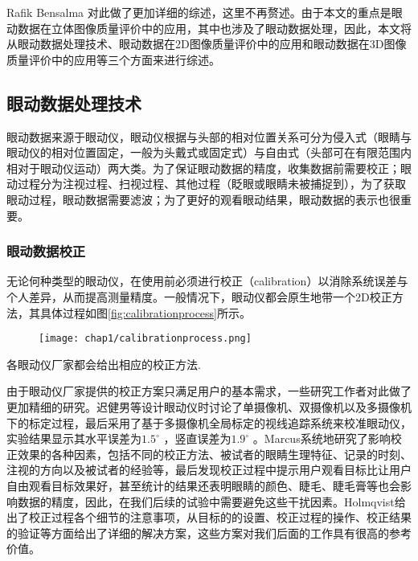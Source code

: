 Rafik Bensalma 对此做了更加详细的综述\parencite{bensalma2013perceptual}，这里不再赘述。由于本文的重点是眼动数据在立体图像质量评价中的应用，其中也涉及了眼动数据处理，因此，本文将从眼动数据处理技术、眼动数据在2D图像质量评价中的应用和眼动数据在3D图像质量评价中的应用等三个方面来进行综述。
\subsection{眼动数据处理技术}
\label{sec:eyetracktechnology}
眼动数据来源于眼动仪，眼动仪根据与头部的相对位置关系可分为侵入式（眼睛与眼动仪的相对位置固定，一般为头戴式或固定式）与自由式（头部可在有限范围内相对于眼动仪运动）两大类。为了保证眼动数据的精度，收集数据前需要校正；眼动过程分为注视过程、扫视过程、其他过程（眨眼或眼睛未被捕捉到），为了获取眼动过程，眼动数据需要滤波；为了更好的观看眼动结果，眼动数据的表示也很重要。
\subsubsection{眼动数据校正}
\label{sec:eyetrackcalibration}
无论何种类型的眼动仪，在使用前必须进行校正（calibration）以消除系统误差与个人差异，从而提高测量精度。一般情况下，眼动仪都会原生地带一个2D校正方法，其具体过程如图\ref{fig:calibrationprocess}所示\parencite{nystrom2013influence}。
\begin{figure}[!htp]
  \centering
  \texttt{[image: chap1/calibrationprocess.png]}
\end{figure}
各眼动仪厂家都会给出相应的校正方法\parencite{iview2009system,manual2011v3,manualuser}.

由于眼动仪厂家提供的校正方案只满足用户的基本需求，一些研究工作者对此做了更加精细的研究。迟健男等\parencite{chi2011sight}设计眼动仪时讨论了单摄像机、双摄像机以及多摄像机下的标定过程，最后采用了基于多摄像机全局标定的视线追踪系统来校准眼动仪，实验结果显示其水平误差为$1.5^{\circ}$ ，竖直误差为$1.9^{\circ}$ 。Marcus系统地研究了影响校正效果的各种因素\parencite{nystrom2013influence}，包括不同的校正方法、被试者的眼睛生理特征、记录的时刻、注视的方向以及被试者的经验等，最后发现校正过程中提示用户观看目标比让用户自由观看目标效果好，甚至统计的结果还表明眼睛的颜色、睫毛、睫毛膏等也会影响数据的精度，因此，在我们后续的试验中需要避免这些干扰因素。Holmqvist给出了校正过程各个细节的注意事项\parencite{holmqvist2011eye}，从目标的的设置、校正过程的操作、校正结果的验证等方面给出了详细的解决方案，这些方案对我们后面的工作具有很高的参考价值。

